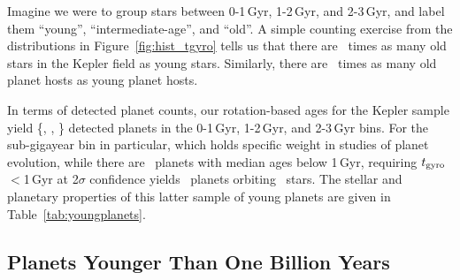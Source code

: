 \documentclass[11pt,twocolumn,tighten]{aastex63}
\begin{document}
%

Imagine we were to group stars between 0-1\,Gyr, 1-2\,Gyr, and
2-3\,Gyr, and label them ``young'', ``intermediate-age'', and ``old''.
A simple counting exercise from the distributions in
Figure~\ref{fig:hist_tgyro} tells us that there are \ratioobtoybstars\
times as many old stars in the Kepler field as young stars.
Similarly, there are \ratioobtoybplanets\ times as many old planet
hosts as young planet hosts. 

In terms of detected planet counts, our rotation-based ages for
the Kepler sample yield \{\nplyounggyro, \nplmidgyro, \nploldgyro\}
detected planets in the 0-1\,Gyr, 1-2\,Gyr, and 2-3\,Gyr bins.
For the sub-gigayear bin in particular, which holds specific weight in
studies of planet evolution, while there are \nplyounggyro\ planets
with median ages below 1\,Gyr, requiring $t_{\rm
gyro}$$<$1\,Gyr at 2$\sigma$ confidence yields
\nplyounggyrotwosigma\ planets orbiting \nplhostsyounggyrotwosigma\
stars.
The stellar and planetary properties of this latter sample of young
planets are given in Table~\ref{tab:youngplanets}.


\subsection{Planets Younger Than One Billion Years}
\end{document}
